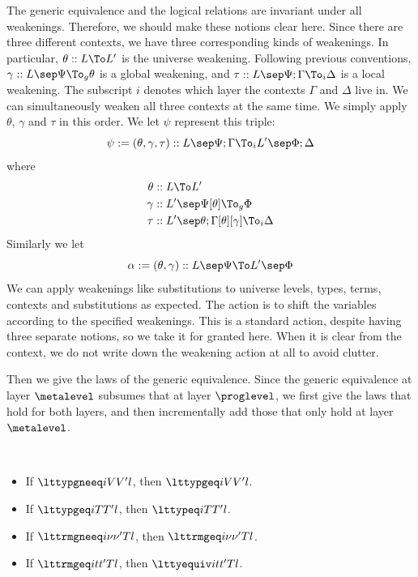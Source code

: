 The generic equivalence and the logical relations are invariant under all
weakenings. %
Therefore, we should make these notions clear here. %
Since there are three different contexts, we have three corresponding kinds of
weakenings. %
In particular, $\theta :: L \To L'$ is the universe weakening. %
Following previous conventions, $\gamma :: L \sep \Psi \To_g \theta$ is a global
weakening, and $\tau :: L \sep \Psi;\Gamma \To_i \Delta$ is a local weakening. %
The subscript $i$ denotes which layer the contexts $\Gamma$ and $\Delta$ live in. %
We can simultaneously weaken all three contexts at the same time. %
We simply apply $\theta$, $\gamma$ and $\tau$ in this order. %
We let $\psi$ represent this triple:
\[
  \psi := (\theta, \gamma, \tau) :: L \sep \Psi; \Gamma \To_i L' \sep \Phi;\Delta
\]
where
\begin{align*}
  \theta &:: L \To L' \\
  \gamma &:: L' \sep \Psi[\theta] \To_g \Phi \\
  \tau &:: L' \sep \theta; \Gamma[\theta][\gamma] \To_i \Delta
\end{align*}
Similarly we let
\[
  \alpha := (\theta, \gamma) :: L \sep \Psi \To L' \sep \Phi
\]
We can apply weakenings like substitutions to universe levels, types, terms, contexts
and substitutions as expected. %
The action is to shift the variables according to the specified weakenings. %
This is a standard action, despite having three separate notions, so we take it for
granted here. %
When it is clear from the context, we do not write down the weakening action at all to
avoid clutter. 

Then we give the laws of the generic equivalence. %
Since the generic equivalence at layer $\metalevel$ subsumes that at layer $\proglevel$, we first give
the laws that hold for both layers, and then incrementally add those that only hold at
layer $\metalevel$.

\begin{law}[Subsumption]$ $
  \begin{itemize}
  \item If $\lttypgneeq i V{V'} l$, then $\lttypgeq i V {V'} l$. 
  \item If $\lttypgeq i T{T'} l$, then $\lttypeq i T{T'} l$. 
  \item If $\lttrmgneeq i \nu{\nu'} T l$, then $\lttrmgeq i \nu{\nu'} T l$.
  \item If $\lttrmgeq i t{t'} T l$, then $\lttyequiv i t{t'} T l$.
  \end{itemize}
\end{law}

